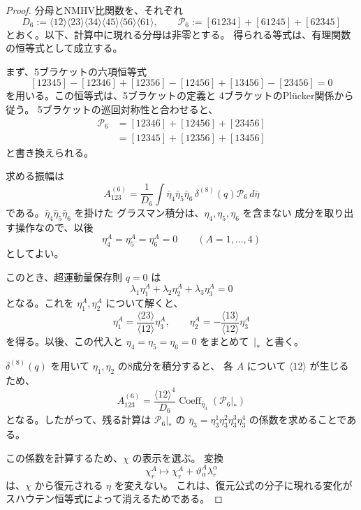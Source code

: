 \documentclass[uplatex,dvipdfmx,a4paper,11pt]{jsarticle}
\renewcommand{\proofname}{Proof}
\newenvironment{myproof}[1][\proofname]
  {\begin{proof}[#1]}
  {\end{proof}}
\numberwithin{equation}{section}
\begin{document}
\begin{myproof}
  分母とNMHV比関数を、それぞれ
  \[
    D_6:=
      \langle12\rangle\langle23\rangle
      \langle34\rangle\langle45\rangle
      \langle56\rangle\langle61\rangle,
    \qquad
    \mathcal P_6:=[61234]+[61245]+[62345]
  \]
  とおく。以下、計算中に現れる分母は非零とする。
  得られる等式は、有理関数の恒等式として成立する。

  まず、5ブラケットの六項恒等式
  \[
    [12345]-[12346]+[12356]
    -[12456]+[13456]-[23456]=0
  \]
  を用いる。この恒等式は、5ブラケットの定義と
  4ブラケットのPl\"ucker関係から従う。
  5ブラケットの巡回対称性と合わせると、
  \[
    \begin{aligned}
      \mathcal P_6
      &=[12346]+[12456]+[23456]\\
      &=[12345]+[12356]+[13456]
    \end{aligned}
  \]
  と書き換えられる。

  求める振幅は
  \[
    A_{123}^{(6)}
      =
      \frac{1}{D_6}
      \int
      \bar\eta_4\bar\eta_5\bar\eta_6\,
      \delta^{(8)}(q)\mathcal P_6\,d\bar\eta
  \]
  である。$\bar\eta_4\bar\eta_5\bar\eta_6$ を掛けた
  グラスマン積分は、$\eta_4,\eta_5,\eta_6$ を含まない
  成分を取り出す操作なので、以後
  \[
    \eta_4^A=\eta_5^A=\eta_6^A=0
    \qquad (A=1,\ldots,4)
  \]
  としてよい。

  このとき、超運動量保存則 $q=0$ は
  \[
    \lambda_1\eta_1^A
    +\lambda_2\eta_2^A
    +\lambda_3\eta_3^A=0
  \]
  となる。これを $\eta_1^A,\eta_2^A$ について解くと、
  \[
    \eta_1^A
      =\frac{\langle23\rangle}{\langle12\rangle}\eta_3^A,
    \qquad
    \eta_2^A
      =-\frac{\langle13\rangle}{\langle12\rangle}\eta_3^A
  \]
  を得る。以後、この代入と
  $\eta_4=\eta_5=\eta_6=0$ をまとめて
  $\left.\vphantom{A}\right|_*$ と書く。

  $\delta^{(8)}(q)$ を用いて
  $\eta_1,\eta_2$ の8成分を積分すると、
  各 $A$ について $\langle12\rangle$ が生じるため、
  \[
    A_{123}^{(6)}
      =
      \frac{\langle12\rangle^4}{D_6}
      \operatorname{Coeff}_{\bar\eta_3}
      \left(\left.\mathcal P_6\right|_*\right)
  \]
  となる。したがって、残る計算は
  $\left.\mathcal P_6\right|_*$ の
  $\bar\eta_3=\eta_3^1\eta_3^2\eta_3^3\eta_3^4$
  の係数を求めることである。

  この係数を計算するため、$\chi$ の表示を選ぶ。
  変換
  \[
    \chi_r^A\longmapsto
    \chi_r^A+\vartheta_\alpha^A\lambda_r^\alpha
  \]
  は、$\chi$ から復元される $\eta$ を変えない。
  これは、復元公式の分子に現れる変化が
  スハウテン恒等式によって消えるためである。


\end{myproof}
\end{document}
